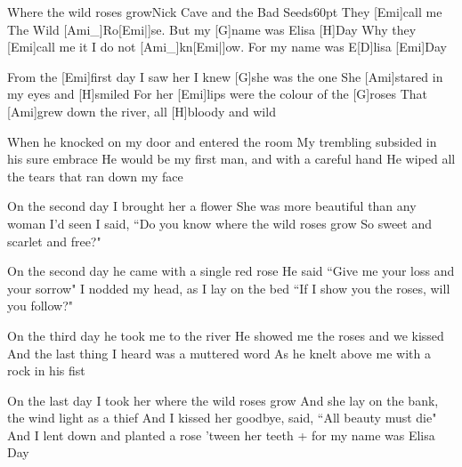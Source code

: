 \begin{song}{Where the wild roses grow}{Nick Cave and the Bad Seeds}{60pt}
\chorus%
They [Emi]call me The Wild [Ami_]{Ro}[Emi|]{se.} But my [G]name was Elisa [H]Day
Why they [Emi]call me it I do not [Ami_]{kn}[Emi|]{ow.} For my name was E[D]lisa [Emi]Day

%
From the [Emi]first day I saw her I knew [G]she was the one
She [Ami]stared in my eyes and [H]smiled
For her [Emi]lips were the colour of the [G]roses
That [Ami]grew down the river, all [H]bloody and wild

When he knocked on my door and entered the room
My trembling subsided in his sure embrace
He would be my first man, and with a careful hand
He wiped all the tears that ran down my face
\repchor

%
On the second day I brought her a flower
She was more beautiful than any woman I'd seen
I said, ``Do you know where the wild roses grow
So sweet and scarlet and free?"

On the second day he came with a single red rose
He said ``Give me your loss and your sorrow"
I nodded my head, as I lay on the bed
``If I show you the roses, will you follow?"
\repchor

%
On the third day he took me to the river
He showed me the roses and we kissed
And the last thing I heard was a muttered word
As he knelt above me with a rock in his fist

On the last day I took her where the wild roses grow
And she lay on the bank, the wind light as a thief
And I kissed her goodbye, said, ``All beauty must die"
And I lent down and planted a rose 'tween her teeth
\repchor + \rl for my name was Elisa Day\rr{}
\end{song}
